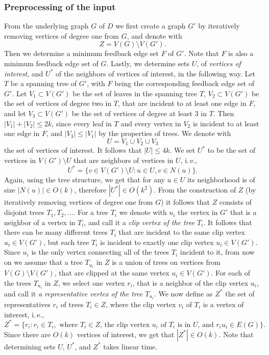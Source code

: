 \documentclass[a4paper,UKenglish,cleveref, autoref, thm-restate]{lipics-v2021}
\newcommand{\ie}{i.\,e.,\ }
\begin{document}
\subsubsection{Preprocessing of the input}
From the underlying graph $G$ of $D$ we first create a graph $G'$ by
iteratively removing vertices of degree one from $G$,
and denote with 
\[
Z = V(G) \setminus V(G').
\]
Then we determine a minimum feedback edge set $F$ of $G'$.
Note that $F$ is also a minimum feedback edge set of $G$.
Lastly, we determine sets $U$, of \emph{vertices of interest}, and $U^*$ of the neighbors of vertices of interest, in the following way.
Let $T$ be a spanning tree of $G'$, with $F$ being the corresponding feedback edge set of $G'$.
Let $V_1 \subset V(G')$ be the set of leaves in the spanning tree $T$, $V_2 \subset V(G')$ be the set of vertices of degree two in $T$, that are incident to at least one edge in $F$, 
and let $V_3 \subset V(G')$ be the set of vertices of degree at least $3$ in $T$. 
Then $|V_1| + |V_2| \leq 2k$, since every leaf in $T$ and every vertex in $V_2$ is incident to at least one edge in $F$,
and $|V_3| \leq |V_1|$ by the properties of trees.
We denote with 
\[U = V_1 \cup V_2 \cup V_3\]
the set of vertices of interest. It follows that $|U| \leq 4k$.
We set $U^*$ to be the set of vertices in $V(G') \setminus U$ that are neighbors of vertices in $U$, \ie 
\[U^* = \{v \in V(G') \setminus U  :  u \in U, v \in N(u)\}.\]
Again, using the tree structure, we get that for any $u \in U$ its neighborhood is of size $|N(u)| \in O(k)$, therefore $|U^*| \in O(k^2)$.
From the construction of $Z$ (by iteratively removing vertices of degree one from $G$)
it follows that $Z$ consists of disjoint trees $T_1, T_2, \dots$.
For a tree $T_i$ we denote with $u_i$ the vertex in $G'$ that is a neighbor of a vertex in $T_i$, 
and call it a \emph{clip vertex of the tree $T_i$}.
It follows that there can be many different trees $T_i$ that are incident to the same clip vertex $u_i \in V(G')$,
but each tree $T_i$ is incident to exactly one clip vertex $u_i \in V(G')$.
Since $u_i$ is the only vertex connecting all of the trees $T_i$ incident to it,
from now on we assume that a tree $T_{u_i}$ in $Z$ is a union of trees on vertices from $V(G) \setminus V(G')$,
that are clipped at the same vertex $u_i \in V(G')$.
For each of the trees $T_{u_i}$ in $Z$, we select one vertex $r_i$, that is a neighbor of the clip vertex $u_i$,
and call it \emph{a representative vertex of the tree $T_{u_i}$}.
We now define as $Z^*$ the set of representatives $r_i$ of trees $T_i \in Z$,
where the clip vertex $v_i$ of $T_i$ is a vertex of interest, \ie
\[
Z^* = \{ r_i  :  r_i \in T_i, \text{ where $T_i \in Z$, the clip vertex $u_i$ of $T_i$ is in $U$, and $r_i u_i \in E(G)$}\}.
\]
Since there are $O(k)$ vertices of interest, we get that $|Z^*| \in O(k)$.
Note that determining sets $U$, $U^*$, and $Z^*$ takes linear time.
\end{document}
